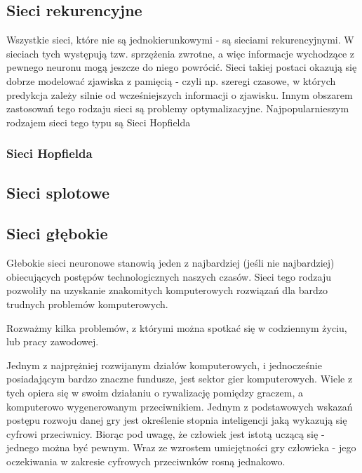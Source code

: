 \documentclass[10pt,a4paper]{book}
\begin{document}
\subsection{Sieci rekurencyjne}

Wszystkie sieci, które nie są jednokierunkowymi - są sieciami rekurencyjnymi. W sieciach tych występują tzw. sprzężenia zwrotne, a więc informacje wychodzące z pewnego neuronu mogą jeszcze do niego powrócić. Sieci takiej postaci okazują się dobrze modelować zjawiska z pamięcią - czyli np. szeregi czasowe, w których predykcja zależy silnie od wcześniejszych informacji o zjawisku. Innym obszarem zastosowań tego rodzaju sieci są problemy optymalizacyjne. Najpopularnieszym rodzajem sieci tego typu są Sieci Hopfielda

\subsubsection{Sieci Hopfielda}


\subsection{Sieci splotowe}


\subsection{Sieci głębokie}

Głebokie sieci neuronowe stanowią jeden z najbardziej (jeśli nie najbardziej) obiecujących postępów technologicznych naszych czasów. Sieci tego rodzaju pozwoliły na uzyskanie znakomitych komputerowych rozwiązań dla bardzo trudnych problemów komputerowych.

Rozważmy kilka problemów, z którymi można spotkać się w codziennym życiu, lub pracy zawodowej.

\begin{problem*}
Jednym z najprężniej rozwijanym działów komputerowych, i jednocześnie posiadającym bardzo znaczne fundusze, jest sektor gier komputerowych. Wiele z tych opiera się w swoim działaniu o rywalizację pomiędzy graczem, a komputerowo wygenerowanym przeciwnikiem. Jednym z podstawowych wskazań postępu rozwoju danej gry jest określenie stopnia inteligencji jaką wykazują się cyfrowi przeciwnicy. Biorąc pod uwagę, że człowiek jest istotą uczącą się - jednego można być pewnym. Wraz ze wzrostem umiejętności gry człowieka - jego oczekiwania w zakresie cyfrowych przeciwnków rosną jednakowo.
\end{problem*}
\end{document}

